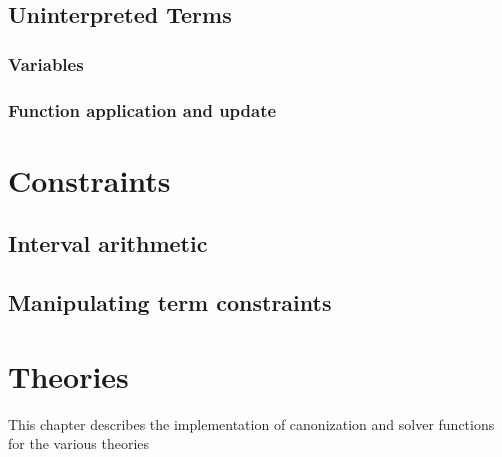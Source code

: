 \documentclass[12pt]{article}
\begin{document}





  \subsection{Uninterpreted Terms}\label{sec:uninterpreted}

  \subsubsection{Variables}\label{subsec:variables}

  

  

 \subsubsection{Function application and update}\label{subsec:app}

  

  


\section{Constraints}\label{sec:cnstrnts}

\subsection{Interval arithmetic}\label{subsec:interval}

  

  

\subsection{Manipulating term constraints}\label{subsec:cnstrnts}

  

  



\section{Theories}\label{sec:theories}

  This chapter describes the implementation of canonization and solver
  functions for the various theories
\end{document}
